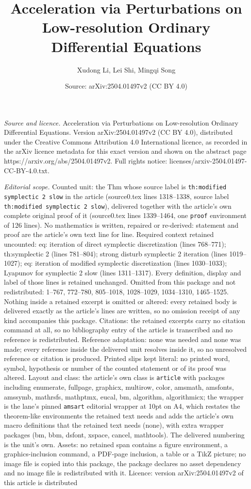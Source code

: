 \documentclass[10pt,a4paper]{amsart}
\title[Acceleration via Perturbations on Low-resolution Ordinary Di]{Acceleration via Perturbations on Low-resolution Ordinary Differential Equations}
\author{Xudong Li, Lei Shi, Mingqi Song}
\date{Source: arXiv:2504.01497v2 (CC BY 4.0)}
\begin{document}
\maketitle

\noindent\emph{Source and licence.} Acceleration via Perturbations on Low-resolution Ordinary Differential Equations. Version arXiv:2504.01497v2 (CC BY 4.0), distributed under the Creative Commons Attribution 4.0 International licence, as recorded in the arXiv licence metadata for this exact version and shown on the abstract page https://arxiv.org/abs/2504.01497v2. Full rights notice: licenses/arxiv-2504.01497-CC-BY-4.0.txt.\par\smallskip

\noindent\textit{Editorial scope.} Counted unit: the Thm whose source label is \texttt{th:modified symplectic 2 slow} in the article (source0.tex lines 1318--1338, source label \texttt{th:modified symplectic 2 slow}), delivered together with the article's own complete original proof of it (source0.tex lines 1339--1464, one \texttt{proof} environment of 126 lines). No mathematics is written, repaired or re-derived: statement and proof are the article's own text line for line. Required context retained uncounted: eq: iteration of direct symplectic discretization (lines 768--771); th:symplectic 2 (lines 781--804); strong disturb symplectic 2 iteration (lines 1019--1027); eq: iteration of modified symplectic discretization (lines 1030--1033); Lyapunov for symplectic 2 slow (lines 1311--1317). Every definition, display and label of those lines is retained unchanged. Omitted from this package and not redistributed: 1--767, 772--780, 805--1018, 1028--1029, 1034--1310, 1465--1525. Nothing inside a retained excerpt is omitted or altered: every retained body is delivered exactly as the article's lines are written, so no omission receipt of any kind accompanies this package. Citations: the retained excerpts carry no citation command at all, so no bibliography entry of the article is transcribed and no reference is redistributed. Reference adaptation: none was needed and none was made; every reference inside the delivered unit resolves inside it, so no unresolved reference or citation is produced. Printed slips kept literal: no printed word, symbol, hypothesis or number of the counted statement or of its proof was altered. Layout and class: the article's own class is \texttt{article} with packages including enumerate, fullpage, graphicx, multirow, color, amsmath, amsfonts, amssymb, mathrsfs, mathptmx, eucal, bm, algorithm, algorithmicx; the wrapper is the lane's pinned \texttt{amsart} editorial wrapper at 10pt on A4, which restates the theorem-like environments the retained text needs and adds the article's own macro definitions that the retained text needs (none), with extra wrapper packages (bm, bbm, dsfont, xspace, cancel, mathtools). The delivered numbering is the unit's own. Assets: no retained span contains a figure environment, a graphics-inclusion command, a PDF-page inclusion, a table or a TikZ picture; no image file is copied into this package, the package declares no asset dependency and no image file is redistributed with it. Licence: version arXiv:2504.01497v2 of this article is distributed 
\end{document}
